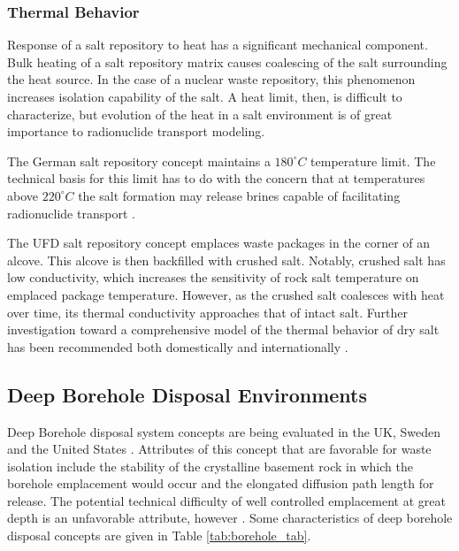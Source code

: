 \subsubsection{Thermal Behavior}
\label{subsec:saltthermal}

Response of a salt repository to heat has a significant
mechanical component. Bulk heating of a salt repository matrix causes
coalescing  of the salt surrounding the heat source. In the case of a nuclear
waste repository, this phenomenon increases isolation capability of the salt. A
heat limit, then, is difficult to characterize, but evolution of the heat in a
salt environment is of great importance to radionuclide transport modeling. 

The German salt repository concept maintains a $180^\circ C$ temperature limit. 
The technical basis for this limit has to do with the concern that at
temperatures above $220^\circ C$ the salt formation may release brines capable 
of facilitating radionuclide transport 
\cite{von_lensa_red-impact_2008, brewitz_long-term_2002}.

The \gls{UFD} salt repository concept emplaces waste packages in the corner of 
an alcove. This alcove is then backfilled with crushed salt. Notably, crushed 
salt has low conductivity, which increases the sensitivity of rock salt 
temperature on emplaced package temperature. However, as the crushed salt 
coalesces with heat over time, its thermal conductivity approaches that of 
intact salt. Further investigation toward a comprehensive model of the thermal 
behavior of dry salt has been recommended both domestically and internationally 
\cite{carter_disposal_2011}. 


\subsection{Deep Borehole Disposal Environments}

Deep Borehole disposal system concepts are being evaluated in the UK, 
Sweden and the United States \cite{von_lensa_red-impact_2008, 
clayton_generic_2011}. Attributes of this concept that are 
favorable for waste isolation include the stability of the crystalline 
basement rock in which the borehole emplacement would occur and the elongated
diffusion path length for release. The potential technical difficulty of well 
controlled emplacement at great depth is an unfavorable attribute, however 
\cite{hardin_generic_2011}.  Some characteristics of deep borehole disposal 
concepts are given in Table \ref{tab:borehole_tab}.   

